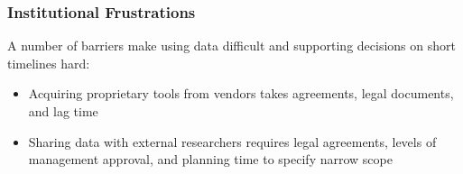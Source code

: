 \documentclass[12pt,handout]{beamer}
\begin{document}
{
\begin{frame}[plain]
\end{frame}
}

\begin{frame}
\frametitle{Institutional Frustrations}
A number of barriers make using data difficult and supporting decisions on short timelines hard:
  \begin{itemize}
  \item Acquiring proprietary tools from vendors takes agreements, legal documents, and lag time
  \pause
  \item Sharing data with external researchers requires legal agreements, levels of management approval, and planning time to specify narrow scope
  \end {itemize}
\end{frame}

{
\begin{frame}[plain]
\end{frame}
}
\end{document}
